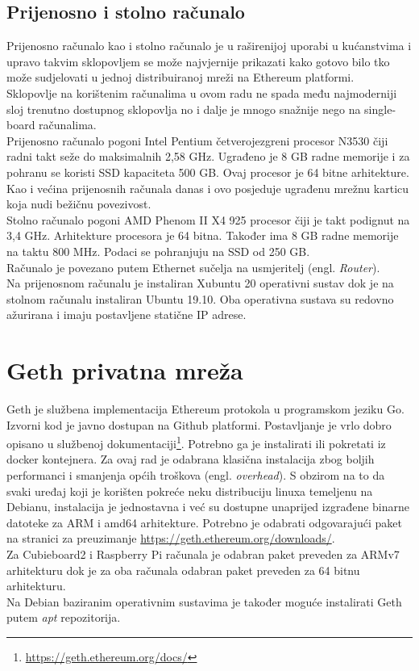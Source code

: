 \documentclass[times, utf8, zavrsni, numeric]{fer}
\begin{document}
\subsection{Prijenosno i stolno računalo}
Prijenosno računalo kao i stolno računalo je u raširenijoj uporabi u kućanstvima i upravo takvim sklopovljem se može
najvjernije prikazati kako gotovo bilo tko može sudjelovati u jednoj distribuiranoj mreži na Ethereum platformi. \\
Sklopovlje na korištenim računalima u ovom radu ne spada među najmoderniji sloj trenutno dostupnog sklopovlja no i dalje
je mnogo snažnije nego na single-board računalima. \\
Prijenosno računalo pogoni Intel Pentium četverojezgreni procesor N3530 čiji radni takt seže do maksimalnih 2,58 GHz.
Ugrađeno je 8 GB radne memorije i za pohranu se koristi SSD kapaciteta 500 GB. Ovaj procesor je 64 bitne arhitekture.
Kao i većina prijenosnih računala danas i ovo posjeduje ugrađenu mrežnu karticu koja nudi bežičnu povezivost. \\
Stolno računalo pogoni AMD Phenom II X4 925 procesor čiji je takt podignut na 3,4 GHz. Arhitekture procesora je 64 bitna.
Također ima 8 GB radne memorije na taktu 800 MHz. Podaci se pohranjuju na SSD od 250 GB. \\
Računalo je povezano putem Ethernet sučelja na usmjeritelj (engl. \emph{Router}). \\
Na prijenosnom računalu je instaliran Xubuntu 20 operativni sustav dok je na stolnom računalu instaliran Ubuntu 19.10.
Oba operativna sustava su redovno ažurirana i imaju postavljene statične IP adrese.
\section{Geth privatna mreža}
Geth je službena implementacija Ethereum protokola u programskom jeziku Go.\citep{geth} Izvorni kod je javno dostupan na Github platformi. 
Postavljanje je vrlo dobro opisano u službenoj dokumentaciji\footnote{\url{https://geth.ethereum.org/docs/}}. Potrebno ga je instalirati ili pokretati iz docker kontejnera. 
Za ovaj rad je odabrana klasična instalacija zbog boljih performanci i smanjenja općih troškova (engl. \emph{overhead}).
S obzirom na to da svaki uređaj koji je korišten pokreće neku distribuciju linuxa temeljenu na Debianu, instalacija je jednostavna
i već su dostupne unaprijed izgrađene binarne datoteke za ARM i amd64 arhitekture. Potrebno je odabrati odgovarajući paket na
stranici za preuzimanje \url{https://geth.ethereum.org/downloads/}.\\ Za Cubieboard2 i Raspberry Pi računala je odabran paket
preveden za ARMv7 arhitekturu dok je za oba računala odabran paket preveden za 64 bitnu arhitekturu. \\
Na Debian baziranim operativnim sustavima je također moguće instalirati Geth putem \emph{apt} repozitorija. \\
\end{document}
